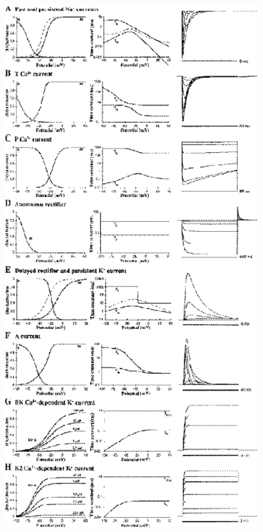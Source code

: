 \documentclass[12pt]{article}
\begin{document}
\begin{figure}[h]
\centering
   \includegraphics[scale=0.75]{figures/Fig.1.2.eps}

\end{figure}
\end{document}
